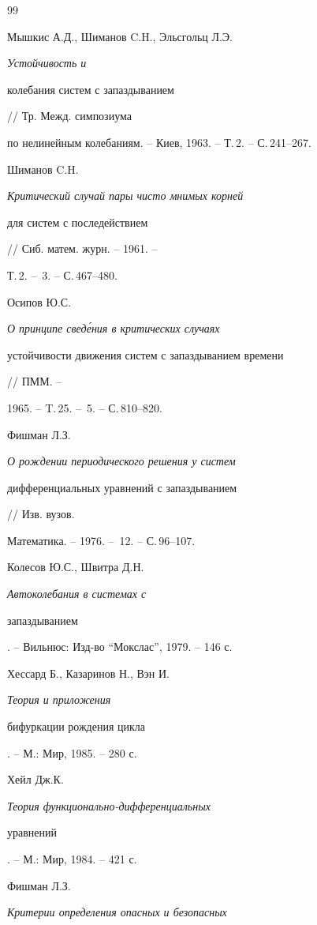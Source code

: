  


 


\begin{thebibliography}{99} 


 




Мышкис А.Д., Шиманов C.H., Эльсгольц Л.Э. {\em Устойчивость и 


колебания систем с запаздыванием} // Тр. Межд. симпозиума 


по нелинейным колебаниям. -- Киев, 1963. -- Т.\,2. -- С.\,241--267. 




Шиманов C.H. {\em Критический случай пары чисто мнимых корней 


для систем с последействием} // Сиб. матем. журн. -- 1961. -- 


Т.\,2. -- \No\,3. -- С.\,467--480. 




Осипов Ю.С. {\em О принципе свед\'ения в критических случаях 


устойчивости движения систем с запаздыванием времени} // ПММ. -- 


1965. -- T.\,25. -- \No\,5. -- С.\,810--820. 




Фишман Л.З. {\em О рождении периодического решения у систем 


дифференциальных уравнений с запаздыванием} // Изв. вузов. 


Математика. -- 1976. -- \No\,12. -- С.\,96--107. 




Колесов Ю.С., Швитра Д.Н. {\em Автоколебания в системах с 


запаздыванием}. -- Вильнюс: Изд-во ``Мокслас'', 1979. -- 146 с. 




Хессард Б., Казаринов Н., Вэн И. {\em Теория и приложения 


бифуркации рождения цикла}. -- М.: Мир, 1985. -- 280 с. 




Хейл Дж.К. {\em Теория функционально-дифференциальных 


уравнений}. -- М.: Мир, 1984. -- 421 с. 




Фишман Л.З. {\em Критерии определения опасных и безопасных 


}
\end{thebibliography}

